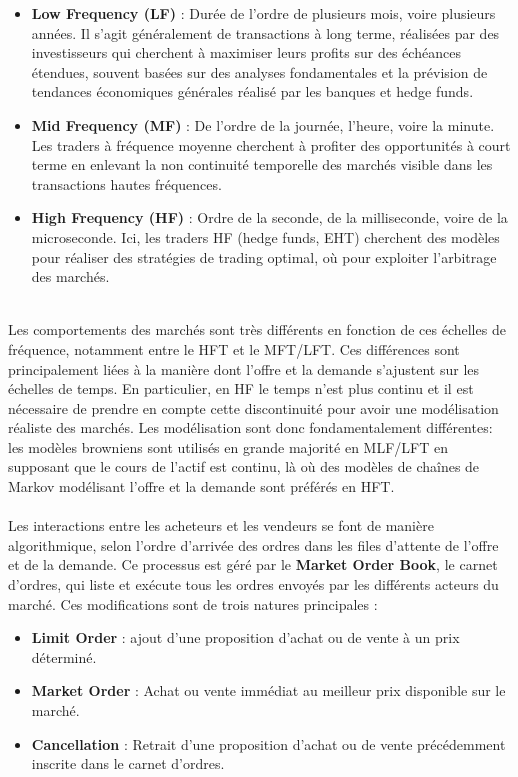 \documentclass[12pt,a4paper]{article}
\theoremstyle{definition}
\theoremstyle{remark}
\begin{document}
    \begin{itemize}
        \item \textbf{Low Frequency (LF)} : Durée de l'ordre de plusieurs mois, voire plusieurs années. Il s'agit généralement de transactions à long terme, réalisées par des investisseurs qui cherchent à maximiser leurs profits sur des échéances étendues, souvent basées sur des analyses fondamentales et la prévision de tendances économiques générales réalisé par les banques et hedge funds.

        \item \textbf{Mid Frequency (MF)} : De l'ordre de la journée, l'heure, voire la minute. Les traders à fréquence moyenne cherchent à profiter des opportunités à court terme en enlevant la non continuité temporelle des marchés visible dans les transactions hautes fréquences. 

        \item \textbf{High Frequency (HF)} : Ordre de la seconde, de la milliseconde, voire de la microseconde. Ici, les traders HF (hedge funds, EHT) cherchent des modèles pour réaliser des stratégies de trading optimal, où pour exploiter l'arbitrage des marchés.
    \end{itemize}
    \\
    Les comportements des marchés sont très différents en fonction de ces échelles de fréquence, notamment entre le HFT et le MFT/LFT. Ces différences sont principalement liées à la manière dont l'offre et la demande s'ajustent sur les échelles de temps. En particulier, en HF le temps n'est plus continu et il est nécessaire de prendre en compte cette discontinuité pour avoir une modélisation réaliste des marchés. Les modélisation sont donc fondamentalement différentes: les modèles browniens sont utilisés en grande majorité en MLF/LFT en supposant que le cours de l'actif est continu, là où des modèles de chaînes de Markov modélisant l'offre et la demande sont préférés en HFT.
    \\
    \\
    Les interactions entre les acheteurs et les vendeurs se font de manière algorithmique, selon l'ordre d'arrivée des ordres dans les files d'attente de l'offre et de la demande. Ce processus est géré par le \textbf{Market Order Book}, le carnet d'ordres, qui liste et exécute tous les ordres envoyés par les différents acteurs du marché. Ces modifications sont de trois natures principales :

    \begin{itemize}
        \item \textbf{Limit Order} : ajout d'une proposition d'achat ou de vente à un prix déterminé. 

        \item \textbf{Market Order} : Achat ou vente immédiat au meilleur prix disponible sur le marché. 

        \item \textbf{Cancellation} : Retrait d'une proposition d'achat ou de vente précédemment inscrite dans le carnet d'ordres.
    \end{itemize}
\end{document}
